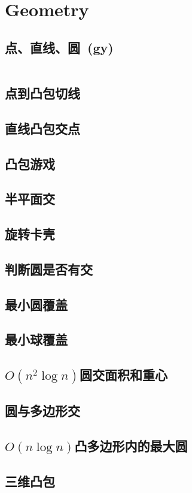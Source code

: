 \chapter{Geometry}
\section{点、直线、圆\ \small(gy)}
	\inputminted{cpp}{Geometry/basic_geometry.cpp}
\section{点到凸包切线}
\section{直线凸包交点}
\section{凸包游戏}
\section{半平面交}
\section{旋转卡壳}
\section{判断圆是否有交}
\section{最小圆覆盖}
\section{最小球覆盖}
\section{$ O(n ^ 2 \log n) $圆交面积和重心}
\section{圆与多边形交}
\section{$ O(n \log n) $凸多边形内的最大圆}
\section{三维凸包}
